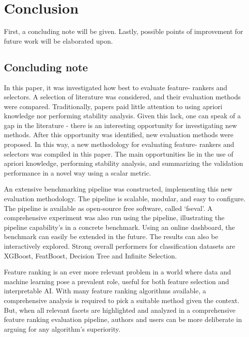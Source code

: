 \documentclass[../main.tex]{subfiles}
\begin{document}
\section{Conclusion}\label{section:conclusion}
First, a concluding note will be given. Lastly, possible points of improvement for future work will be elaborated upon.

\subsection{Concluding note}
In this paper, it was investigated how best to evaluate feature- rankers and selectors. A selection of literature was considered, and their evaluation methods were compared. Traditionally, papers paid little attention to using \gls{apriori} knowledge nor performing stability analysis. Given this lack, one can speak of a gap in the literature - there is an interesting opportunity for investigating new methods.
After this opportunity was identified, new evaluation methods were proposed. In this way, a new methodology for evaluating feature- rankers and selectors was compiled in this paper. The main opportunities lie in the use of \gls{apriori} knowledge, performing stability analysis, and summarizing the validation performance in a novel way using a scalar metric.

An extensive benchmarking pipeline was constructed, implementing this new evaluation methodology. The pipeline is scalable, modular, and easy to configure. The pipeline is available as open-source free software, called `fseval'. A comprehensive experiment was also run using the pipeline, illustrating the pipeline capability's in a concrete benchmark. Using an online dashboard, the benchmark can easily be extended in the future. The results can also be interactively explored. Strong overall performers for classification datasets are XGBoost, FeatBoost, Decision Tree and Infinite Selection. 

Feature ranking is an ever more relevant problem in a world where data and machine learning pose a prevalent role, useful for both feature selection and interpretable AI. With many feature ranking algorithms available, a comprehensive analysis is required to pick a suitable method given the context. But, when all relevant facets are highlighted and analyzed in a comprehensive feature ranking evaluation pipeline, authors and users can be more deliberate in arguing for any algorithm’s superiority.
\end{document}
